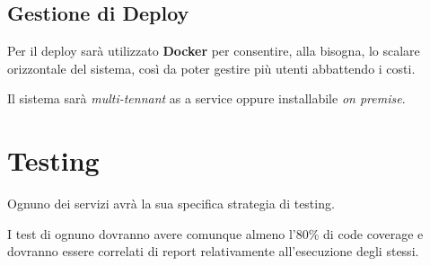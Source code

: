 \documentclass[
]{article}
\begin{document}
\hypertarget{gestione-di-deploy}{%
\subsection{Gestione di Deploy}\label{gestione-di-deploy}}

Per il deploy sarà utilizzato \textbf{Docker} per consentire, alla
bisogna, lo scalare orizzontale del sistema, così da poter gestire più
utenti abbattendo i costi.

Il sistema sarà \emph{multi-tennant} as a service oppure installabile
\emph{on premise}.

\hypertarget{testing}{%
\section{Testing}\label{testing}}

Ognuno dei servizi avrà la sua specifica strategia di testing.

I test di ognuno dovranno avere comunque almeno l'80\% di code coverage
e dovranno essere correlati di report relativamente all'esecuzione degli
stessi.
\end{document}
